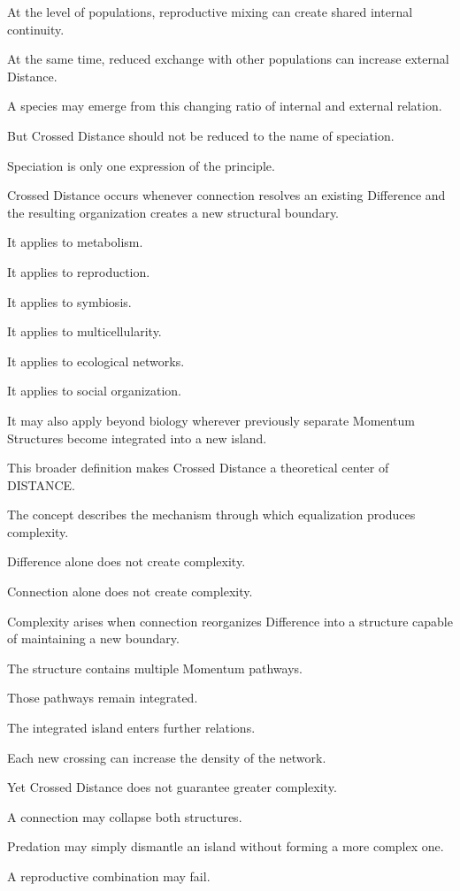 At the level of populations, reproductive mixing can create shared internal continuity.

At the same time, reduced exchange with other populations can increase external Distance.

A species may emerge from this changing ratio of internal and external relation.

But Crossed Distance should not be reduced to the name of speciation.

Speciation is only one expression of the principle.

Crossed Distance occurs whenever connection resolves an existing Difference and the resulting organization creates a new structural boundary.

It applies to metabolism.

It applies to reproduction.

It applies to symbiosis.

It applies to multicellularity.

It applies to ecological networks.

It applies to social organization.

It may also apply beyond biology wherever previously separate Momentum Structures become integrated into a new island.

This broader definition makes Crossed Distance a theoretical center of DISTANCE.

The concept describes the mechanism through which equalization produces complexity.

Difference alone does not create complexity.

Connection alone does not create complexity.

Complexity arises when connection reorganizes Difference into a structure capable of maintaining a new boundary.

The structure contains multiple Momentum pathways.

Those pathways remain integrated.

The integrated island enters further relations.

Each new crossing can increase the density of the network.

Yet Crossed Distance does not guarantee greater complexity.

A connection may collapse both structures.

Predation may simply dismantle an island without forming a more complex one.

A reproductive combination may fail.

